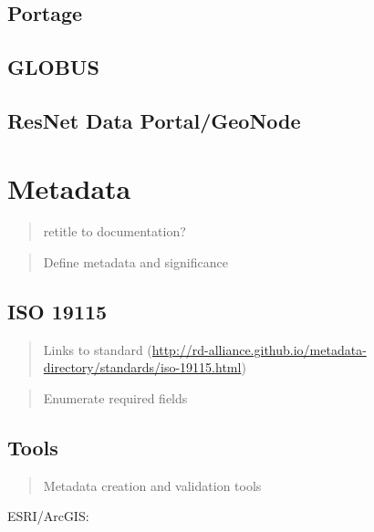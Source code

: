 \documentclass[
]{book}
\begin{document}
\hypertarget{portage}{%
\subsection{Portage}\label{portage}}

\hypertarget{globus}{%
\subsection{GLOBUS}\label{globus}}

\hypertarget{resnet-data-portalgeonode}{%
\subsection{ResNet Data Portal/GeoNode}\label{resnet-data-portalgeonode}}

\hypertarget{metadata}{%
\section{Metadata}\label{metadata}}

\begin{quote}
retitle to documentation?
\end{quote}

\begin{quote}
Define metadata and significance
\end{quote}

\hypertarget{iso-19115}{%
\subsection{ISO 19115}\label{iso-19115}}

\begin{quote}
Links to standard (\url{http://rd-alliance.github.io/metadata-directory/standards/iso-19115.html})
\end{quote}

\begin{quote}
Enumerate required fields
\end{quote}

\hypertarget{tools}{%
\subsection{Tools}\label{tools}}

\begin{quote}
Metadata creation and validation tools
\end{quote}

ESRI/ArcGIS:
\end{document}
